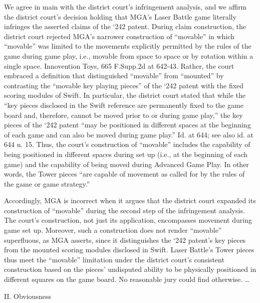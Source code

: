 We agree in main with the district court's infringement
analysis,\textsuperscript{ }and we affirm the district court's decision holding
that MGA's Laser Battle game literally infringes the asserted claims of the
`242 patent. During claim construction, the district court rejected MGA's
narrower construction of ``movable'' in which ``movable'' was limited to the
movements explicitly permitted by the rules of the game during game play, i.e.,
movable from space to space or by rotation within a single space. Innovention
Toys, 665 F.Supp.2d at 642-43. Rather, the court embraced a definition that
distinguished ``movable'' from ``mounted'' by contrasting the ``movable key
playing pieces'' of the `242 patent with the fixed scoring modules of Swift. In
particular, the district court stated that while the ``key pieces disclosed in
the Swift reference are permanently fixed to the game board and, therefore,
cannot be moved prior to or during game play,'' the key pieces of the `242
patent ``may be positioned in different spaces at the beginning of each game
and can also be moved during game play.'' Id. at 644; see also id. at 644 n.
15. Thus, the court's construction of ``movable'' includes the capability of
being positioned in different spaces during set up (i.e., at the beginning of
each game) and the capability of being moved during Advanced Game Play. In
other words, the Tower pieces ``are capable of movement as called for by the
rules of the game or game strategy.''

Accordingly, MGA is incorrect when it argues that the district court expanded
its construction of ``movable'' during the second step of the infringement
analysis. The court's construction, not just its application, encompasses
movement during game set up. Moreover, such a construction does not render
``movable'' superfluous, as MGA asserts, since it distinguishes the `242
patent's key pieces from the mounted scoring modules disclosed in Swift. Laser
Battle's Tower pieces thus meet the ``movable'' limitation under the district
court's consistent construction based on the pieces' undisputed ability to be
physically positioned in different squares on the game board. No reasonable
jury could find otherwise. {\dots}

{\centering
II. Obviousness
\par}

